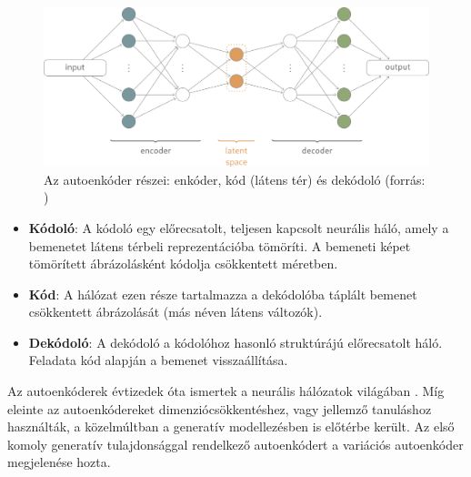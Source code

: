 

\begin{figure}[ht]
	\centering
	\includegraphics[width=1\columnwidth]{figures/ae.png}
	\caption{Az autoenkóder részei: enkóder, kód (látens tér) és dekódoló (forrás: \cite{fig:autoenc_struct})}
	\label{fig:autoenc_struct}
\end{figure}

\begin{itemize}
	\item \textbf{Kódoló}: A kódoló egy előrecsatolt, teljesen kapcsolt neurális háló, amely a bemenetet látens térbeli reprezentációba tömöríti. A bemeneti képet tömörített ábrázolásként kódolja csökkentett méretben.
	\item \textbf{Kód}: A hálózat ezen része tartalmazza a dekódolóba táplált bemenet csökkentett ábrázolását (más néven látens változók).
	\item \textbf{Dekódoló}: A dekódoló a kódolóhoz hasonló struktúrájú előrecsatolt háló. Feladata kód alapján a bemenet visszaállítása.
\end{itemize}

Az autoenkóderek évtizedek óta ismertek a neurális hálózatok világában \cite{hinton1994autoencoders}. Míg eleinte az autoenkódereket dimenziócsökkentéshez, vagy jellemző tanuláshoz használták, a közelmúltban a generatív modellezésben is előtérbe került. Az első komoly generatív tulajdonsággal rendelkező autoenkódert a variációs autoenkóder megjelenése hozta.


